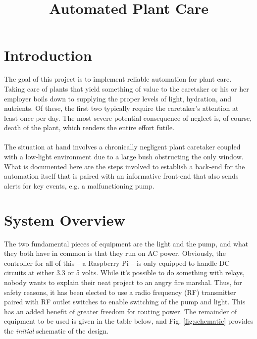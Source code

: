 \documentclass[]{article}
\title{Automated Plant Care}
\date{}
\begin{document}
\maketitle

\section{Introduction}
The goal of this project is to implement reliable automation for plant care.  Taking care of plants that yield something of value to the caretaker or his or her employer boils down to supplying the proper levels of light, hydration, and nutrients.  Of these, the first two typically require the caretaker's attention at least once per day.  The most severe potential consequence of neglect is, of course, death of the plant, which renders the entire effort futile.
\\\\
The situation at hand involves a chronically negligent plant caretaker coupled with a low-light environment due to a large bush obstructing the only window.  What is documented here are the steps involved to establish a back-end for the automation itself that is paired with an informative front-end that also sends alerts for key events, e.g. a malfunctioning pump.

\section{System Overview}
The two fundamental pieces of equipment are the light and the pump, and what they both have in common is that they run on AC power.  Obviously, the controller for all of this -- a Raspberry Pi -- is only equipped to handle DC circuits at either 3.3 or 5 volts.  While it's possible to do something with relays, nobody wants to explain their neat project to an angry fire marshal.  Thus, for safety reasons, it has been elected to use a radio frequency (RF) transmitter paired with RF outlet switches to enable switching of the pump and light.  This has an added benefit of greater freedom for routing power.  The remainder of equipment to be used is given in the table below, and Fig. \ref{fig:schematic} provides the \textit{initial} schematic of the design.
\end{document}
